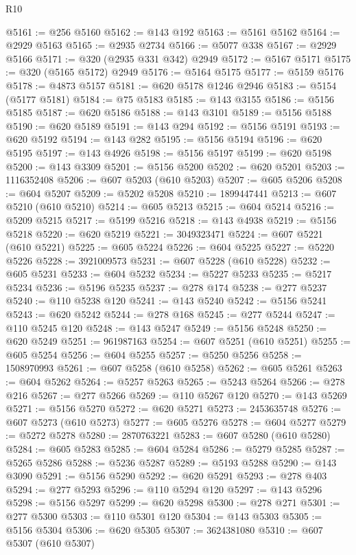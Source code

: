\begin{lexlean}{R10}
\begin{coremodule}
@5161 := @256 @5160
@5162 := @143 @192
@5163 := @5161 @5162
@5164 := @2929 @5163
@5165 := @2935 @2734
@5166 := @5077 @338
@5167 := @2929 @5166
@5171 := @320 (@2935 @331 @342) @2949
@5172 := @5167 @5171
@5175 := @320 (@5165 @5172) @2949
@5176 := @5164 @5175
@5177 := @5159 @5176
@5178 := @4873 @5157
@5181 := @620 @5178 @1246 @2946
@5183 := @5154 (@5177 @5181)
@5184 := @75 @5183
@5185 := @143 @3155
@5186 := @5156 @5185
@5187 := @620 @5186
@5188 := @143 @3101
@5189 := @5156 @5188
@5190 := @620 @5189
@5191 := @143 @294
@5192 := @5156 @5191
@5193 := @620 @5192
@5194 := @143 @282
@5195 := @5156 @5194
@5196 := @620 @5195
@5197 := @143 @4926
@5198 := @5156 @5197
@5199 := @620 @5198
@5200 := @143 @3309
@5201 := @5156 @5200
@5202 := @620 @5201
@5203 := 1116352408
@5206 := @607 @5203 (@610 @5203)
@5207 := @605 @5206
@5208 := @604 @5207
@5209 := @5202 @5208
@5210 := 1899447441
@5213 := @607 @5210 (@610 @5210)
@5214 := @605 @5213
@5215 := @604 @5214
@5216 := @5209 @5215
@5217 := @5199 @5216
@5218 := @143 @4938
@5219 := @5156 @5218
@5220 := @620 @5219
@5221 := 3049323471
@5224 := @607 @5221 (@610 @5221)
@5225 := @605 @5224
@5226 := @604 @5225
@5227 := @5220 @5226
@5228 := 3921009573
@5231 := @607 @5228 (@610 @5228)
@5232 := @605 @5231
@5233 := @604 @5232
@5234 := @5227 @5233
@5235 := @5217 @5234
@5236 := @5196 @5235
@5237 := @278 @174
@5238 := @277 @5237
@5240 := @110 @5238 @120
@5241 := @143 @5240
@5242 := @5156 @5241
@5243 := @620 @5242
@5244 := @278 @168
@5245 := @277 @5244
@5247 := @110 @5245 @120
@5248 := @143 @5247
@5249 := @5156 @5248
@5250 := @620 @5249
@5251 := 961987163
@5254 := @607 @5251 (@610 @5251)
@5255 := @605 @5254
@5256 := @604 @5255
@5257 := @5250 @5256
@5258 := 1508970993
@5261 := @607 @5258 (@610 @5258)
@5262 := @605 @5261
@5263 := @604 @5262
@5264 := @5257 @5263
@5265 := @5243 @5264
@5266 := @278 @216
@5267 := @277 @5266
@5269 := @110 @5267 @120
@5270 := @143 @5269
@5271 := @5156 @5270
@5272 := @620 @5271
@5273 := 2453635748
@5276 := @607 @5273 (@610 @5273)
@5277 := @605 @5276
@5278 := @604 @5277
@5279 := @5272 @5278
@5280 := 2870763221
@5283 := @607 @5280 (@610 @5280)
@5284 := @605 @5283
@5285 := @604 @5284
@5286 := @5279 @5285
@5287 := @5265 @5286
@5288 := @5236 @5287
@5289 := @5193 @5288
@5290 := @143 @3090
@5291 := @5156 @5290
@5292 := @620 @5291
@5293 := @278 @403
@5294 := @277 @5293
@5296 := @110 @5294 @120
@5297 := @143 @5296
@5298 := @5156 @5297
@5299 := @620 @5298
@5300 := @278 @271
@5301 := @277 @5300
@5303 := @110 @5301 @120
@5304 := @143 @5303
@5305 := @5156 @5304
@5306 := @620 @5305
@5307 := 3624381080
@5310 := @607 @5307 (@610 @5307)

\end{coremodule}
\end{lexlean}
